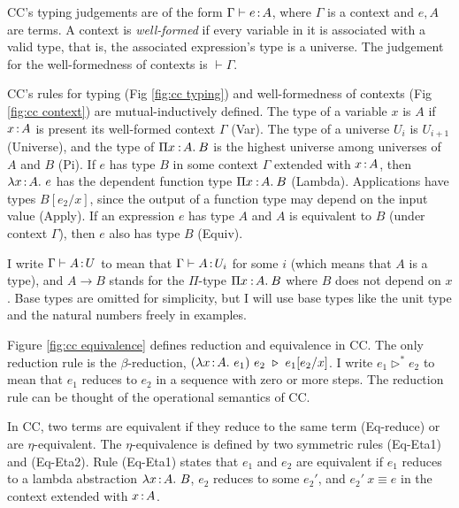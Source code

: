 CC's typing judgements are of the form $\Gamma \vdash e \hspace{0.5mm}{:}\hspace{0.5mm} A$, where $\Gamma$ is a context and $e, A$ are terms. A context is \textit{well-formed} if every variable in it is associated with a valid type, that is, the associated expression’s type is a universe. The judgement for the well-formedness of contexts is $\vdash \Gamma$. 

CC's rules for typing (Fig \ref{fig:cc typing}) and well-formedness of contexts (Fig \ref{fig:cc context}) are mutual-inductively defined. The type of a variable $x$ is $A$ if $x \hspace{0.5mm}{:}\hspace{0.5mm} A$ is present its well-formed context $\Gamma$ (Var). 
The type of a universe $U_i$ is $U_{i+1}$ (Universe), and the type of $\Pi x\mkern1.5mu{\hspace{0.5mm}{:}\hspace{0.5mm}} A.\hspace{0.8mm}B$ is the highest universe among universes of $A$ and $B$ (Pi). If $e$ has type $B$ in some context $\Gamma$ extended with $x \hspace{0.5mm}{:}\hspace{0.5mm} A$, then $\lambda x\hspace{0.5mm}{:}\hspace{0.5mm} A.\ e$ has the dependent function type $\Pi x\mkern1.5mu{\hspace{0.5mm}{:}\hspace{0.5mm}} A.\hspace{0.8mm}B$ (Lambda). Applications have types $B[e_2\slash x]$, since the output of a function type may depend on the input value (Apply). If an expression $e$ has type $A$ and $A$ is equivalent to $B$ (under context $\Gamma$), then $e$ also has type $B$ (Equiv). 

I write $\Gamma \vdash A \hspace{0.5mm}{:}\hspace{0.5mm} U$ to mean that $\Gamma \vdash A \hspace{0.5mm}{:}\hspace{0.5mm} U_i$ for some $i$ (which means that $A$ is a type), and $A \rightarrow B$ stands for the $\Pi$-type $\Pi x\mkern1.5mu{\hspace{0.5mm}{:}\hspace{0.5mm}} A.\hspace{0.8mm}B$ where $B$ does not depend on $x$. Base types are omitted for simplicity, but I will use base types like the unit type and the natural numbers freely in examples.

Figure \ref{fig:cc equivalence} defines reduction and equivalence in CC. The only reduction rule is the $\beta$-reduction, $(\lam{x}{A}{e_1}) \ e_2 \ \triangleright \ e_1\sub{e_2}{x}$. I write $e_1 \triangleright^* e_2$ to mean that $e_1$ reduces to $e_2$ in a sequence with zero or more steps. The reduction rule can be thought of the operational semantics of CC.

In CC, two terms are equivalent if they reduce to the same term (Eq-reduce) or are $\eta$-equivalent. The $\eta$-equivalence is defined by two symmetric rules (Eq-Eta1) and (Eq-Eta2). Rule (Eq-Eta1) states that $e_1$ and $e_2$ are equivalent if $e_1$ reduces to a lambda abstraction $\lambda x\hspace{0.5mm}{:}\hspace{0.5mm} A.\ B$, $e_2$ reduces to some $e_2'$, and $e_2'\ x \equiv e$ in the context extended with $x \hspace{0.5mm}{:}\hspace{0.5mm} A$.

